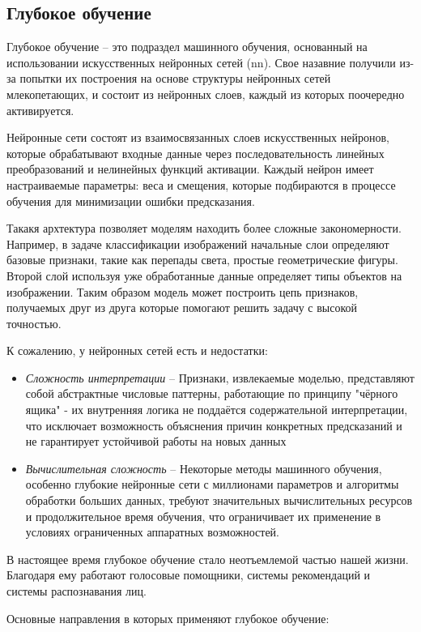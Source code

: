 \documentclass[../part_1.tex]{subfiles}
\begin{document}
\subsection{Глубокое обучение}
\par Глубокое обучение -- это подраздел машинного обучения, основанный на использовании искусственных нейронных сетей (\acrshort{nn}). Свое назавние получили из-за попытки их построения на основе структуры нейронных сетей млекопетающих, и состоит из нейронных слоев, каждый из которых поочередно активируется.
\par Нейронные сети состоят из взаимосвязанных слоев искусственных нейронов, которые обрабатывают входные данные через последовательность линейных преобразований и нелинейных функций активации. Каждый нейрон имеет настраиваемые параметры: веса и смещения, которые подбираются в процессе обучения для минимизации ошибки предсказания. 
\par Такакя архтектура позволяет моделям находить более сложные закономерности. Например, в задаче классификации изображений начальные слои определяют базовые признаки, такие как перепады света, простые геометрические фигуры. Второй слой используя уже обработанные данные определяет типы объектов на изображении. Таким образом модель может построить цепь признаков, получаемых друг из друга которые помогают решить задачу с высокой точностью.
\par К сожалению, у нейронных сетей есть и недостатки:
\begin{itemize}
    \item \textit{Сложность интерпретации} -- Признаки, извлекаемые моделью, представляют собой абстрактные числовые паттерны, работающие по принципу "чёрного ящика" - их внутренняя логика не поддаётся содержательной интерпретации, что исключает возможность объяснения причин конкретных предсказаний и не гарантирует устойчивой работы на новых данных
    \item \textit{Вычислительная сложность} -- Некоторые методы машинного обучения, особенно глубокие нейронные сети с миллионами параметров и алгоритмы обработки больших данных, требуют значительных вычислительных ресурсов и продолжительное время обучения, что ограничивает их применение в условиях ограниченных аппаратных возможностей.
\end{itemize}
\par В настоящее время глубокое обучение стало неотъемлемой частью нашей жизни. Благодаря ему работают голосовые помощники, системы рекомендаций и системы распознавания лиц.
\par Основные направления в которых применяют глубокое обучение:
\end{document}
